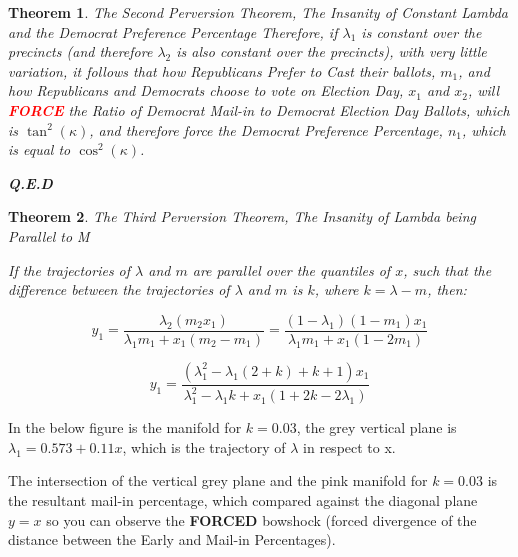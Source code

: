 \documentclass[preprint,13pt]{elsarticle}
\newtheorem{theorem}{Theorem}[section]
\begin{document}
\begin{theorem}{The Second Perversion Theorem, The Insanity of Constant Lambda and the Democrat Preference Percentage}
Therefore, if $\lambda_{1}$ is constant over the precincts (and therefore $\lambda_{2}$ is also constant over the precincts), with very little variation, it follows that how Republicans Prefer to Cast their ballots, $m_{1}$, and how Republicans and Democrats choose to vote on Election Day, $x_{1}$ and $x_{2}$, will \textbf{\textcolor{red}{FORCE}} the Ratio of Democrat Mail-in to Democrat Election Day Ballots, which is $\tan^{2}(\kappa)$, and therefore force the Democrat Preference Percentage, $n_{1}$, which is equal to $\cos^{2}(\kappa)$.
\begin{flushright}
\textbf{Q.E.D}
\end{flushright}
\end{theorem}
\newpage
\begin{theorem}{The Third Perversion Theorem, The Insanity of Lambda being Parallel to M}

If the trajectories of $\lambda$ and $m$ are parallel over the quantiles of $x$, such that the difference between the trajectories of $\lambda$ and $m$ is $k$, where $k=\lambda-m$, then:

$$y_{1}=\frac{\lambda_{2}(m_{2}x_{1})}{\lambda_{1}m_{1}+x_{1}(m_{2}-m_{1})}=\frac{(1-\lambda_{1})(1-m_{1})x_{1}}{\lambda_{1}m_{1}+x_{1}(1-2m_{1})}$$

$$y_{1}=\frac{(\lambda_{1}^2-\lambda_{1}(2+k)+k+1)x_{1}}{\lambda_{1}^2-\lambda_{1}k+x_{1}(1+2k-2\lambda_{1})}$$
\end{theorem}
In the below figure is the manifold for $k=0.03$, the grey vertical plane is $\lambda_{1}=0.573+0.11x$, which is the trajectory of $\lambda$ in respect to x. 

The intersection of the vertical grey plane and the pink manifold for $k=0.03$ is the resultant mail-in percentage, which compared against the diagonal plane $y=x$ so you can observe the \textbf{FORCED} bowshock (forced divergence of the distance between the Early and Mail-in Percentages). 
\end{document}
